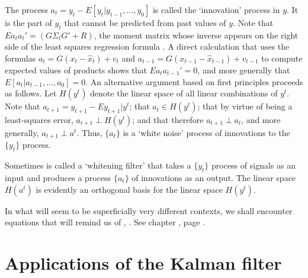 The process $a_t = y_t - E[y_t | y_{t-1}, \ldots, y_0]$ is called the  `innovation' process in $y$. It is the part
of $y_t$ that cannot be predicted from past values of $y$.
Note that $E a_t a_t' = (G \Sigma_t G' + R)$, the moment matrix whose inverse appears on the right side of the
least squares regression formula .  A direct calculation that uses the formulas $a_t = G(x_t - \hat x_t) + v_t$
and $a_{t-1} = G (x_{t-1} - \hat x_{t-1}) + v_{t-1}$ to compute expected values of products shows that
$E a_t a_{t-1}' = 0$, and more generally that $E [a_t | a_{t-1}, \ldots, a_0]=0$.
An alternative argument based on first principles proceeds as follows. Let $H(y^t)$ denote the linear space of all linear combinations
of $y^t$.   Note that $a_{t+1} = y_{t+1} - E y_{t+1}| y^t$;
that $a_{t} \in H(y^{t})$; that by virtue of being a least-squares error, $a_{t+1} \perp H(y^t)$; and that therefore $a_{t+1} \perp a_t$, and more
generally, $a_{t+1} \perp a^t$.  Thus, $\{a_t\}$ is a `white noise' process of innovations to the $\{y_t\}$ process.

Sometimes  is called a `whitening filter' that takes a $\{y_t\}$ process of signals as an input and produces a process $\{a_t\}$ of
innovations as an output. The linear space $H(a^t)$ is evidently an orthogonal basis for the linear space $H(y^t)$.




In what will seem to be superficially very different contexts, we shall  encounter equations that will remind us
of , . See chapter , page .
%
%


\section{Applications  of the Kalman filter}\label{Kfilterapplications}%
